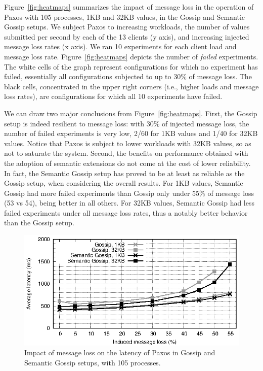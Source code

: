 Figure~\ref{fig:heatmaps} summarizes the impact of message loss in the
operation of Paxos with 105 processes, 1KB and 32KB values, in the Gossip and
Semantic Gossip setups.
We subject Paxos to increasing workloads, the number of values submitted per second
by each of the 13 clients (y axis), and increasing injected message loss rates
(x axis).
We ran 10 experiments for each client load and message loss rate.
Figure~\ref{fig:heatmaps} depicts the number of {\em failed} experiments.
The white cells of the graph represent configurations for which no experiment
has failed, essentially all configurations subjected to up to 30\% of message
loss.
The black cells, concentrated in the upper right corners (i.e., higher loads
and message loss rates), are configurations for which all 10 experiments have
failed.

We can draw two major conclusions from Figure~\ref{fig:heatmaps}.
%
First, the Gossip setup is indeed resilient to message loss: with 30\% of
injected message loss, the number of failed experiments is very low, 2/60 for
1KB values and 1/40 for 32KB values.
Notice that Paxos is subject to lower workloads with 32KB values, so as not to
saturate the system.
%
Second, the benefits on performance obtained with the adoption of semantic
extensions do not come at the cost of lower reliability.
In fact, the Semantic Gossip setup has proved to be at least as reliable as the Gossip
setup, when considering the overall results.
%
For 1KB values, Semantic Gossip had more failed experiments than Gossip only
under 55\% of message loss (53 vs 54), being better in all others.
For 32KB values, Semantic Gossip had less failed experiments under all message
loss rates, thus a notably better behavior than the Gossip setup.

\begin{figure}[t]
\centering
\includegraphics[width=\columnwidth]{figures/msgloss-lat-loss.eps}
\caption{Impact of message loss on the latency of Paxos in Gossip and Semantic
	Gossip setups, with 105 processes.}
\label{fig:msgloss}
\end{figure}


